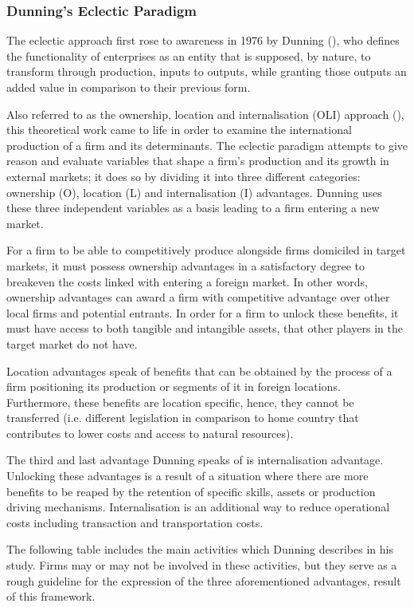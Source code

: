 \documentclass[11pt,a4paper]{article}
\begin{document}
{{\subsubsection{Dunning's Eclectic Paradigm}
The eclectic approach first rose to awareness in 1976 by Dunning (\citeyear{dunningEclecticParadigmInternational2015}), who defines the functionality of enterprises as an entity that is supposed, by nature, to transform through production, inputs to outputs, while granting those outputs an added value in comparison to their previous form. \par
Also referred to as the ownership, location and internalisation (OLI) approach (\cite{dunningEclecticTheoryInternational1980}), this theoretical work came to life in order to examine the international production of a firm and its determinants. The eclectic paradigm attempts to give reason and evaluate variables that shape a firm's production and its growth in external markets; it does so by dividing it into three different categories: ownership (O), location (L) and internalisation (I) advantages. Dunning uses these three independent variables as a basis leading to a firm entering a new market. \par
For a firm to be able to competitively produce alongside firms domiciled in target markets, it must possess ownership advantages in a satisfactory degree to breakeven the costs linked with entering a foreign market. In other words, ownership advantages can award a firm with competitive advantage over other local firms and potential entrants. In order for a firm to unlock these benefits, it must have access to both tangible and intangible assets, that other players in the target market do not have.  \par
Location advantages speak of benefits that can be obtained by the process of a firm positioning its production or segments of it in foreign locations. Furthermore, these benefits are location specific, hence, they cannot be transferred (i.e. different legislation in comparison to home country that contributes to lower costs and access to natural resources). \par
The third and last advantage Dunning speaks of is internalisation advantage. Unlocking these advantages is a result of a situation where there are more benefits to be reaped by the retention of specific skills, assets or production driving mechanisms. Internalisation is an additional way to reduce operational costs including transaction and transportation costs. \par
The following table includes the main activities which Dunning describes in his study. Firms may or may not be involved in these activities, but they serve as a rough guideline for the expression of the three aforementioned advantages, result of this framework. 

}}
\end{document}

